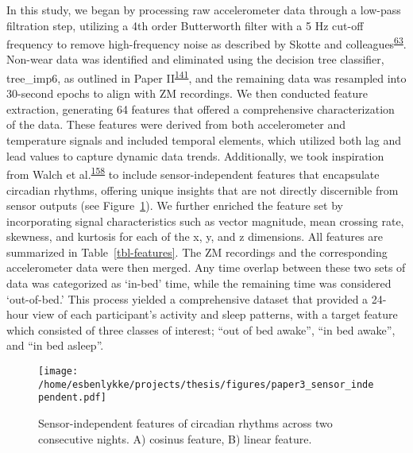 \documentclass[
  10pt,
]{scrbook}
\begin{document}
In this study, we began by processing raw accelerometer data through a
low-pass filtration step, utilizing a 4th order Butterworth filter with
a 5 Hz cut-off frequency to remove high-frequency noise as described by
Skotte and
colleagues\textsuperscript{\protect\hyperlink{ref-skotte_detection_2014}{63}}.
Non-wear data was identified and eliminated using the decision tree
classifier, \textsf{tree\_imp6}, as outlined in Paper
II\textsuperscript{\protect\hyperlink{ref-skovgaard_generalizability_2023}{141}},
and the remaining data was resampled into 30-second epochs to align with
ZM recordings. We then conducted feature extraction, generating 64
features that offered a comprehensive characterization of the data.
These features were derived from both accelerometer and temperature
signals and included temporal elements, which utilized both lag and lead
values to capture dynamic data trends. Additionally, we took inspiration
from Walch et
al.\textsuperscript{\protect\hyperlink{ref-walch_sleep_2019}{158}} to
include sensor-independent features that encapsulate circadian rhythms,
offering unique insights that are not directly discernible from sensor
outputs (see Figure~\ref{fig-paper3_sensor_independent}). We further
enriched the feature set by incorporating signal characteristics such as
vector magnitude, mean crossing rate, skewness, and kurtosis for each of
the x, y, and z dimensions. All features are summarized in
Table~\ref{tbl-features}. The ZM recordings and the corresponding
accelerometer data were then merged. Any time overlap between these two
sets of data was categorized as `in-bed' time, while the remaining time
was considered `out-of-bed.' This process yielded a comprehensive
dataset that provided a 24-hour view of each participant's activity and
sleep patterns, with a target feature which consisted of three classes
of interest; ``out of bed awake'', ``in bed awake'', and ``in bed
asleep''.

\begin{figure}

{\centering \texttt{[image: /home/esbenlykke/projects/thesis/figures/paper3\_sensor\_independent.pdf]}

}

\caption{\label{fig-paper3_sensor_independent}Sensor-independent
features of circadian rhythms across two consecutive nights. A) cosinus
feature, B) linear feature.}

\end{figure}

\begingroup
\end{document}
